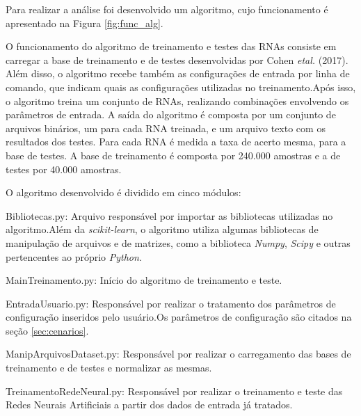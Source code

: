 \documentclass[12pt,oneside,a4paper,chapter=TITLE,section=TITLE,sumario
		=tradicional]{abntex2}
\begin{document}
		Para realizar a análise foi desenvolvido um algoritmo, cujo funcionamento é apresentado na Figura \ref{fig:func_alg}.
		
		\begin{figure}[H]
		\end{figure}
		
		O funcionamento do algoritmo de treinamento e testes das RNAs consiste em carregar a base de treinamento e de testes desenvolvidas por Cohen \textit{et\hspace{0.1cm}al.} (2017). Além disso, o algoritmo recebe também as configurações de entrada por linha de comando, que indicam quais as configurações utilizadas no treinamento.\hspace{0.1cm}Após isso, o algoritmo treina um conjunto de RNAs, realizando combinações envolvendo os parâmetros de entrada. A saída do algoritmo é composta por um conjunto de arquivos binários, um para cada RNA treinada, e um arquivo texto com os resultados dos testes. Para cada RNA é medida a taxa de acerto mesma, para a base de testes. A base de treinamento é composta por 240.000 amostras e a de testes por 40.000 amostras.
		
		O algoritmo desenvolvido é dividido em cinco módulos:
		
		\begin{lista}
			
			\item Bibliotecas.py: Arquivo responsável por importar as bibliotecas utilizadas no algoritmo.\hspace{0.1cm}Além da \textit{scikit-learn}, o algoritmo utiliza algumas bibliotecas de manipulação de arquivos e de matrizes, como a biblioteca \textit{Numpy}, \textit{Scipy} e outras pertencentes ao próprio \textit{Python}.	
			
			\item MainTreinamento.py: Início do algoritmo de treinamento e teste.
			
			\item EntradaUsuario.py: Responsável por realizar o tratamento dos parâmetros de configuração inseridos pelo usuário.\hspace{0.1cm}Os parâmetros de configuração são citados na seção \ref{sec:cenarios}.
			
			\item ManipArquivosDataset.py: Responsável por realizar o carregamento das bases de treinamento e de testes e normalizar as mesmas.

			\item TreinamentoRedeNeural.py: Responsável por realizar o treinamento e teste das Redes Neurais Artificiais a partir dos dados de entrada já tratados.
		\end{lista}
		
\end{document}

